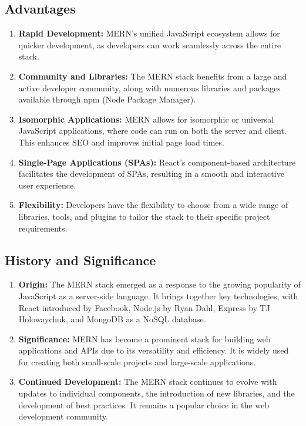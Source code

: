 \documentclass[11pt]{article}
\begin{document}
\subsection{Advantages}

\begin{enumerate}
    \item \textbf{Rapid Development:} MERN's unified JavaScript ecosystem allows for quicker development, as developers can work seamlessly across the entire stack.

    \item \textbf{Community and Libraries:} The MERN stack benefits from a large and active developer community, along with numerous libraries and packages available through npm (Node Package Manager).

    \item \textbf{Isomorphic Applications:} MERN allows for isomorphic or universal JavaScript applications, where code can run on both the server and client. This enhances SEO and improves initial page load times.

    \item \textbf{Single-Page Applications (SPAs):} React's component-based architecture facilitates the development of SPAs, resulting in a smooth and interactive user experience.

    \item \textbf{Flexibility:} Developers have the flexibility to choose from a wide range of libraries, tools, and plugins to tailor the stack to their specific project requirements.

\end{enumerate}

\subsection{History and Significance}

\begin{enumerate}
    \item \textbf{Origin:} The MERN stack emerged as a response to the growing popularity of JavaScript as a server-side language. It brings together key technologies, with React introduced by Facebook, Node.js by Ryan Dahl, Express by TJ Holowaychuk, and MongoDB as a NoSQL database.

    \item \textbf{Significance:} MERN has become a prominent stack for building web applications and APIs due to its versatility and efficiency. It is widely used for creating both small-scale projects and large-scale applications.

    \item \textbf{Continued Development:} The MERN stack continues to evolve with updates to individual components, the introduction of new libraries, and the development of best practices. It remains a popular choice in the web development community.

\end{enumerate}
\end{document}
